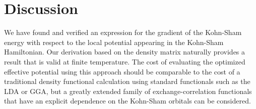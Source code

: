 \documentclass{article}
\begin{document}
\section{Discussion}

We have found and verified an expression for the gradient of the Kohn-Sham energy with
respect to the local potential appearing in the Kohn-Sham Hamiltonian.  Our derivation
based on the density matrix naturally provides a result that is valid at finite temperature.
The cost of evaluating the optimized effective potential using this approach should be
comparable to the cost of a traditional density functional calculation using standard
functionals such as the LDA or GGA, but a greatly extended family of exchange-correlation
functionals that have an explicit dependence on the Kohn-Sham orbitals can be considered.

%
%
\end{document}
